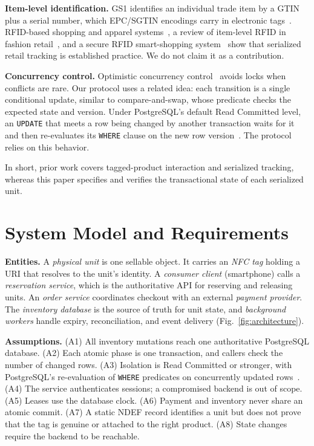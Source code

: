 \documentclass[conference]{IEEEtran}
\begin{document}
\textbf{Item-level identification.}
GS1 identifies an individual trade item by a GTIN plus a serial
number, which EPC/SGTIN encodings carry in electronic
tags~\cite{refGS1TDS}. RFID-based shopping and apparel
systems~\cite{refHou,refChoi}, a review of item-level RFID in fashion
retail~\cite{refCilloni}, and a secure RFID smart-shopping
system~\cite{refLi} show that serialized retail tracking is
established practice. We do not claim it as a contribution.

\textbf{Concurrency control.}
Optimistic concurrency control~\cite{refKung} avoids locks when
conflicts are rare. Our protocol uses a related idea: each transition
is a single conditional update, similar to compare-and-swap, whose
predicate checks the expected state and version. Under PostgreSQL's
default Read Committed level, an \texttt{UPDATE} that meets a row
being changed by another transaction waits for it and then
re-evaluates its \texttt{WHERE} clause on the new row
version~\cite{refPGIsolation}. The protocol relies on this behavior.

In short, prior work covers tagged-product interaction and
serialized tracking, whereas this paper specifies and verifies the
transactional state of each serialized unit.

\section{System Model and Requirements}
\label{sec:model}

\textbf{Entities.}
A \emph{physical unit} is one sellable object. It carries an
\emph{NFC tag} holding a URI that resolves to the unit's identity. A
\emph{consumer client} (smartphone) calls a \emph{reservation service},
which is the authoritative API for reserving and releasing units. An
\emph{order service} coordinates checkout with an external
\emph{payment provider}. The \emph{inventory database} is the source
of truth for unit state, and \emph{background workers} handle expiry,
reconciliation, and event delivery (Fig.~\ref{fig:architecture}).

\textbf{Assumptions.}
(A1) All inventory mutations reach one authoritative PostgreSQL
database. (A2) Each atomic phase is one transaction, and callers check
the number of changed rows. (A3) Isolation is Read Committed or
stronger, with PostgreSQL's re-evaluation of \texttt{WHERE}
predicates on concurrently updated rows~\cite{refPGIsolation}.
(A4) The service authenticates sessions; a compromised backend is out
of scope. (A5) Leases use the database clock. (A6) Payment and
inventory never share an atomic commit. (A7) A static NDEF record
identifies a unit but does not prove that the tag is genuine or
attached to the right product. (A8) State changes require the backend
to be reachable.
\end{document}
